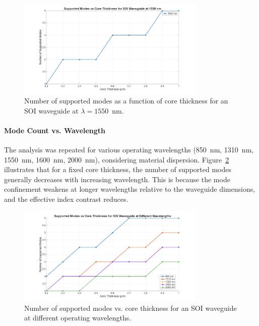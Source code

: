 \documentclass[10pt, a4paper]{article}
\begin{document}
\begin{figure}[h!]
    \centering
    \includegraphics[width=0.8\textwidth]{task1/modes_vs_thickness_SOI_1550nm.png}
    \caption{Number of supported modes as a function of core thickness for an SOI waveguide at $\lambda = 1550$~nm.}
    \label{fig:modes_vs_thickness_SOI_1550nm}
\end{figure}

\paragraph{Mode Count vs. Wavelength}
The analysis was repeated for various operating wavelengths (850~nm, 1310~nm, 1550~nm, 1600~nm, 2000~nm), considering material dispersion. Figure~\ref{fig:modes_vs_thickness_SOI_wavelengths} illustrates that for a fixed core thickness, the number of supported modes generally decreases with increasing wavelength. This is because the mode confinement weakens at longer wavelengths relative to the waveguide dimensions, and the effective index contrast reduces.

\begin{figure}[h!]
    \centering
    \includegraphics[width=0.8\textwidth]{task1/modes_vs_thickness_SOI_wavelengths.png}
    \caption{Number of supported modes vs. core thickness for an SOI waveguide at different operating wavelengths.}
    \label{fig:modes_vs_thickness_SOI_wavelengths}
\end{figure}
\end{document}
